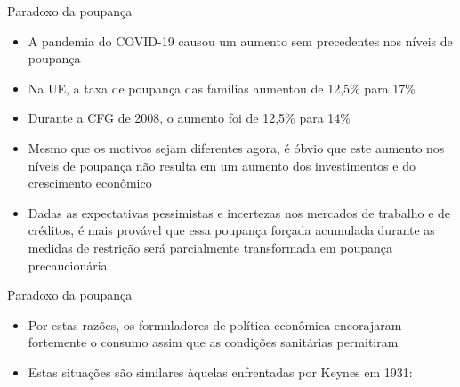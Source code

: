 \documentclass[10pt]{beamer}
\begin{document}
\begin{frame}{Paradoxo da poupança}
    \begin{itemize}
        \item A pandemia do COVID-19 causou um aumento sem precedentes nos níveis de poupança\bigskip

        \item Na UE, a taxa de poupança das famílias aumentou de 12,5\% para 17\%\bigskip

        \item Durante a CFG de 2008, o aumento foi de 12,5\% para 14\%\bigskip

        \item Mesmo que os motivos sejam diferentes agora, é óbvio que este aumento nos níveis de poupança não resulta em um aumento dos investimentos e do crescimento econômico\bigskip

        \item Dadas as expectativas pessimistas e incertezas nos mercados de trabalho e de créditos, é mais provável que essa poupança forçada acumulada durante as medidas de restrição será parcialmente transformada em poupança precaucionária
    \end{itemize}
\end{frame}

\begin{frame}{Paradoxo da poupança}
    \begin{itemize}
        \item Por estas razões, os formuladores de política econômica encorajaram fortemente o consumo assim que as condições sanitárias permitiram\bigskip

        \item Estas situações são similares àquelas enfrentadas por Keynes em 1931:\bigskip
    \end{itemize}
\end{frame}
\end{document}
